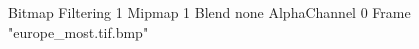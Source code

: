 {Bitmap
	{Filtering 1}
	{Mipmap 1}
	{Blend none}
	{AlphaChannel 0}
	{Frame "europe_most.tif.bmp"}
}
